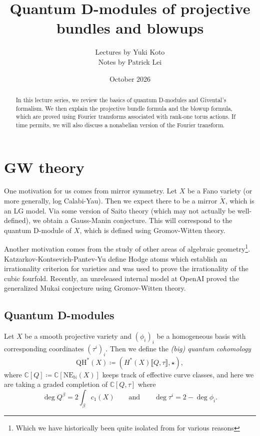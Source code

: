 \documentclass{amsart}
\title{Quantum D-modules of projective bundles and blowups}
\author{Lectures by Yuki Koto \\ Notes by Patrick Lei}
\date{October 2026}
\theoremstyle{definition}
\theoremstyle{remark}
\theoremstyle{plain}
\theoremstyle{definition}
\theoremstyle{remark}
\newcommand{\N}{\mathbb{N}}
\newcommand{\C}{\mathbb{C}}
\newcommand{\mr}[1]{\mathrm{#1}}
\newcommand{\1}{\mathbf{1}}
\newcommand{\2}{\mathbf{2}}
\newcommand{\3}{\mathbf{3}}
\newcommand{\ps}[1]{\lBrack #1 \rBrack}
\begin{document}
    
\begin{abstract}
    In this lecture series, we review the basics of quantum D-modules and Givental's formalism. We then explain the projective bundle formula and the blowup formula, which are proved using Fourier transforms associated with rank-one torus actions. If time permits, we will also discuss a nonabelian version of the Fourier transform.
\end{abstract}

\maketitle

\tableofcontents

\section{GW theory}

One motivation for us comes from mirror symmetry. Let \(X\) be a Fano variety (or more generally, log Calabi-Yau). Then we expect there to be a mirror \(\check{X}\), which is an LG model. Via some version of Saito theory (which may not actually be well-defined), we obtain a Gauss-Manin conjecture. This will correspond to the quantum D-module of \(X\), which is defined using Gromov-Witten theory.

Another motivation comes from the study of other areas of algebraic geometry\footnote{Which we have historically been quite isolated from for various reasons}. Katzarkov-Kontsevich-Pantev-Yu define Hodge atoms which establish an irrationality criterion for varieties and was used to prove the irrationality of the cubic fourfold. Recently, an unreleased internal model at OpenAI proved the generalized Mukai conjecture using Gromov-Witten theory.

\subsection{Quantum D-modules}

Let \(X\) be a smooth projective variety and \((\phi_i)_i\) be a homogeneous basis with corresponding coordinates \((\tau^i)_i\). Then we define the \textit{(big) quantum cohomology} 
\[ \mr{QH}^*(X) \coloneqq (H^*(X) \ps{Q, \tau}, \star), \]
where \(\C[Q] \coloneqq \C[\mr{NE}_{\N}(X)]\) keeps track of effective curve classes, and here we are taking a graded completion of \(\C[Q, \tau]\) where
\[ \deg Q^{\beta} = 2 \int_{\beta} c_1(X) \qquad \text{and} \qquad \deg \tau^i = 2 - \deg \phi_i. \]
\end{document}
